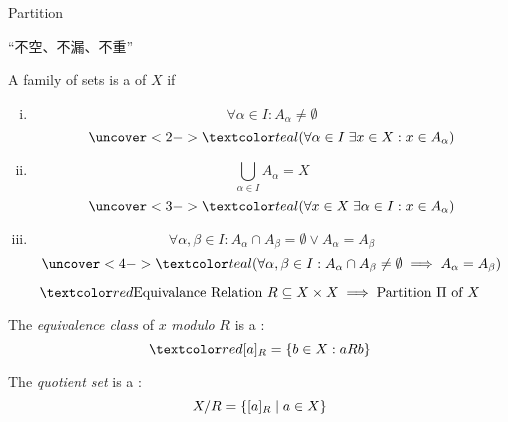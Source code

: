 \begin{frame}{}
  \centerline{\LARGE Partition}

  \vspace{0.60cm}

  \begin{center}
    ``不空、不漏、不重''
  \end{center}
\end{frame}

\begin{frame}{}
  \begin{definition}[Partition]
    A family of sets  is a  of $X$ if

    \begin{enumerate}[(i)]
      \item 
	\[
	  \forall \alpha \in I: A_{\alpha} \neq \emptyset
	\]
	\[
	  \uncover<2->{\teal{(\forall \alpha \in I \; \exists x \in X: x \in A_{\alpha})}}
	\]
      \item 
	\[
	  \bigcup_{\alpha \in I} A_{\alpha} = X
	\]
	\[
	  \uncover<3->{\teal{(\forall x \in X \; \exists \alpha \in I: x \in A_{\alpha})}}
	\]
      \item 
	\[
	  \forall \alpha, \beta \in I: A_{\alpha} \cap A_{\beta} = \emptyset \lor A_{\alpha} = A_{\beta}
	\]
	\[
	  \uncover<4->{\teal{(\forall \alpha, \beta \in I: A_{\alpha} \cap A_{\beta} \neq \emptyset \implies A_{\alpha} = A_{\beta})}}
	\]
    \end{enumerate}
  \end{definition}
\end{frame}

\begin{frame}{}
  \[
    \red{\text{Equivalance Relation } R \subseteq X \times X \implies \text{Partition } \Pi \text{ of } X}
  \]

  \pause
  \begin{definition}
    The {\it equivalence class} of $x$ {\it modulo} $R$ is a :
    \[
      \red{[a]_{R}} = \set{b \in X: a R b}
    \]
  \end{definition}

  \pause
  \vspace{0.60cm}
  \begin{definition}
    The {\it quotient set} is a :
    \[
      X/R = \{[a]_{R} \mid a \in X\}
    \]
  \end{definition}
\end{frame}

